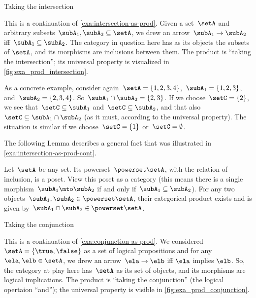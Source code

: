 \begin{marginfigure}
	\centering
	\caption{Taking the intersection}
	\label{fig:exa_prod_intersection_cont}
\end{marginfigure}

\begin{example}
	\label{exa:intersection-as-prod-cont}
	This is a continuation of \cref{exa:intersection-as-prod}.
	Given a set~$\setA$ and arbitrary subsets~$\subA_1, \subA_2 \subseteq \setA$, we drew an arrow~$\subA_1 \to \subA_2$ iff~$\subA_1 \subseteq \subA_2$.
	The category in question here has as its objects the subsets of $\setA$, and its morphisms are inclusions between them.
	The product is ``taking the intersection''; its universal property is visualized in \cref{fig:exa_prod_intersection}.

	As a concrete example, consider again~$\setA = \{ 1, 2, 3, 4 \}$,~$\subA_1 = \{ 1, 2, 3 \}$, and~$\subA_2 = \{2, 3, 4 \}$.
	So~$\subA_1 \cap \subA_2 = \{2, 3 \}$.
	If we choose~$\setC = \{ 2 \}$, we see that~$\setC \subseteq \subA_1$ and~$\setC \subseteq \subA_2$, and that also~$\setC \subseteq \subA_1 \cap \subA_2$ (as it must, according to the universal property).
	The situation is similar if we choose~$\setC = \{ 1\}$ or~$\setC = \emptyset$.
\end{example}

The following Lemma describes a general fact that was illustrated in \cref{exa:intersection-as-prod-cont}.
\begin{lemma}
	\label{lem:cat-product-powerset}
	Let~$\setA$ be any set.
	Its powerset~$\powerset \setA$, with the relation of inclusion, is a poset.
	View this poset as a category (this means there is a single morphism~$\subA_1 \mto \subA_2$ if and only if~$\subA_1 \subseteq \subA_2$).
	For any two objects~$\subA_1, \subA_2 \in \powerset \setA$, their categorical product exists and is given by~$\subA_1 \cap \subA_2 \in \powerset \setA$.
\end{lemma}

\begin{marginfigure}
	\centering
	\caption{Taking the conjunction}
	\label{fig:exa_prod_conjunction_cont}
\end{marginfigure}

\begin{example}
	\label{exa:conjunction-as-prod-cont}
	This is a continuation of \cref{exa:conjunction-as-prod}.
	We considered~$\setA = \{ \true, \false \}$ as a set of logical propositions and for any~$\ela, \elb  \in \setA$, we drew an arrow~$\ela \to \elb$ iff $\ela$ implies $\elb$.
	So, the category at play here has~$\setA$ as its set of objects, and its morphisms are logical implications.
	The product is ``taking the conjunction'' (the logical opertaion ``and''); the universal property is visible in \cref{fig:exa_prod_conjunction}.

\end{example}

